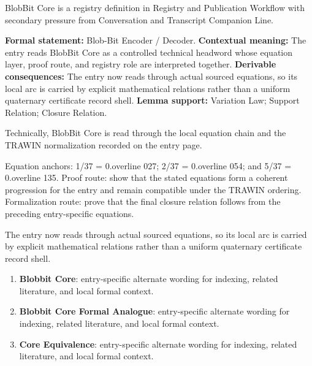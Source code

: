 
\begingroup\small
{}
BlobBit Core is a registry definition in Registry and Publication Workflow with secondary pressure from Conversation and Transcript Companion Line.

\begingroup\footnotesize\setlength{\emergencystretch}{3em}\sloppy
\textbf{Formal statement:} Blob-Bit Encoder / Decoder. \textbf{Contextual meaning:} The entry reads BlobBit Core as a controlled technical headword whose equation layer, proof route, and registry role are interpreted together. \textbf{Derivable consequences:} The entry now reads through actual sourced equations, so its local arc is carried by explicit mathematical relations rather than a uniform quaternary certificate record shell. \textbf{Lemma support:} Variation Law; Support Relation; Closure Relation.\par
\endgroup

Technically, BlobBit Core is read through the local equation chain and the TRAWIN normalization recorded on the entry page.

Equation anchors: 1/37 = 0.overline 027; 2/37 = 0.overline 054; and 5/37 = 0.overline 135. Proof route: show that the stated equations form a coherent progression for the entry and remain compatible under the TRAWIN ordering. Formalization route: prove that the final closure relation follows from the preceding entry-specific equations.

The entry now reads through actual sourced equations, so its local arc is carried by explicit mathematical relations rather than a uniform quaternary certificate record shell.
\endgroup

\begin{enumerate}[leftmargin=1.6em,itemsep=6pt,topsep=4pt]
\item \textbf{Blobbit Core}: entry-specific alternate wording for indexing, related literature, and local formal context.
\item \textbf{Blobbit Core Formal Analogue}: entry-specific alternate wording for indexing, related literature, and local formal context.
\item \textbf{Core Equivalence}: entry-specific alternate wording for indexing, related literature, and local formal context.
\end{enumerate}

